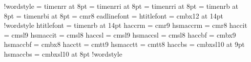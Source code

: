 \if!wordstyle
    \font\eightrm = timenrr  at 8pt
    \font\eightsl = timenrri at 8pt
    \font\eightit = timenrri at 8pt
    \font\eightbf = timenrb  at 8pt
    \font\eightbs = timenrbi at 8pt
    \font\eightot = cmr8\fi
\def\eightpoint{%
    \def\rm{\fam0\eightrm}%
        \textfont0 = \eightrm\scriptfont0 = \sixrm\scriptscriptfont0 = \fiverm%
    \textfont1 = \eighti \scriptfont1 = \sixi   \scriptscriptfont1 = \fivei%
    \textfont2 = \eightsy\scriptfont2 = \sixsy  \scriptscriptfont2 = \fivesy%
    \textfont3 = \eightex\scriptfont3 = \eightex\scriptscriptfont3 = \eightex%
    \def\it{\fam\itfam\eightit}\textfont\itfam = \eightit%
    \def\sl{\fam\slfam\eightsl}\textfont\slfam = \eightsl%
    \def\tt{\fam\ttfam\eighttt}\textfont\ttfam = \eighttt%
    \def\bf{\fam\bffam\eightbf}\textfont\bffam = \eightbf%
    \def\sc{\fam\scfam\eightsc}\textfont\scfam = \eightsc%
    \def\bs{\fam\bsfam\eightbs}\textfont\bsfam = \eightbs%
    \if!wordstyle
        \def\ot{\fam\otfam\eightot}%
            \textfont\otfam = \eightot%
            \scriptfont\otfam = \sixot \scriptscriptfont\otfam = \fiveot\fi%
    \tt\ttglue = .5em plus.25em minus.15em%
    \normalbaselineskip = 9pt
    \setbox\strutbox = \hbox{\vrule height8pt depth3pt width0pt}%
    \normalbaselines\rm}
%
\let\!headlinefont = \eightrm
\font\!titlefont   = cmbx12 at 14pt
\if!wordstyle
    \font\!titlefont = timenrb at 14pt\fi
%
\font\!accrm = cmr9            \font\!smaccrm = cmr8
\font\!accit = cmsl9           \font\!smaccit = cmsl8
\font\!accsl = cmsl9           \font\!smaccsl = cmsl8
\font\!accbf = cmbx9           \font\!smaccbf = cmbx8
\font\!acctt = cmtt9           \font\!smacctt = cmtt8
\font\!accbs = cmbxsl10 at 9pt \font\!smaccbs = cmbxsl10 at 8pt
\if!wordstyle
